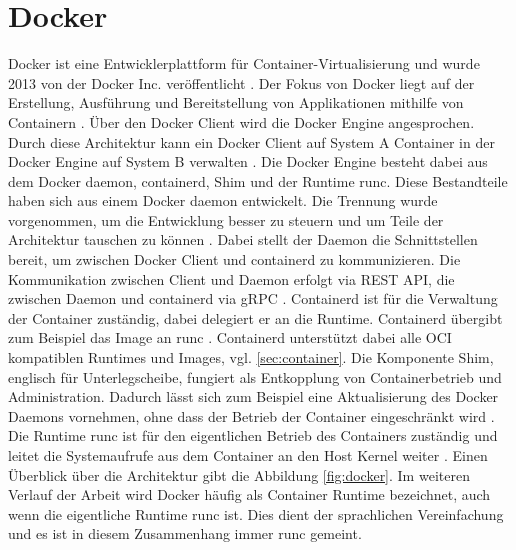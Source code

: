 \section{Docker}
\label{sec:docker}
Docker ist eine Entwicklerplattform für Container-Virtualisierung und wurde 2013 von der Docker Inc. veröffentlicht \cite[vgl.][10]{Jangla.2018}. Der Fokus von Docker liegt auf der Erstellung, Ausführung und Bereitstellung von Applikationen mithilfe von Containern \cite[vgl.][11]{Jangla.2018}.
Über den Docker Client wird die Docker Engine angesprochen. Durch diese Architektur kann ein Docker Client auf System A Container in der Docker Engine auf System B verwalten \cite[vgl.][55]{Poulton.2017}.
Die Docker Engine besteht dabei aus dem Docker daemon, containerd, Shim und der Runtime runc. Diese Bestandteile haben sich aus einem Docker daemon entwickelt. Die Trennung wurde vorgenommen, um die Entwicklung besser zu steuern und um Teile der Architektur tauschen zu können \cite[vgl.][55]{Poulton.2017}. 
Dabei stellt der Daemon die Schnittstellen bereit, um zwischen Docker Client und containerd zu kommunizieren. Die Kommunikation zwischen Client und Daemon erfolgt via REST API, die zwischen  Daemon und containerd via gRPC \cite[vgl.][60]{Poulton.2017}. 
Containerd ist für die Verwaltung der Container zuständig, dabei delegiert er an die Runtime. Containerd übergibt zum Beispiel das Image an runc \cite[vgl.][59]{Poulton.2017}. Containerd unterstützt dabei alle \ac{OCI} kompatiblen Runtimes und Images, vgl. \ref{sec:container}. Die Komponente Shim, englisch für Unterlegscheibe, fungiert als Entkopplung von Containerbetrieb und Administration. Dadurch lässt sich zum Beispiel eine Aktualisierung des Docker Daemons vornehmen, ohne dass der Betrieb der Container eingeschränkt wird  \cite[vgl.][S. 62 f.]{Poulton.2017}. Die Runtime runc ist für den eigentlichen Betrieb des Containers zuständig und leitet die Systemaufrufe aus dem Container an den Host Kernel weiter \cite[vgl.][59]{Poulton.2017}. Einen Überblick über die Architektur gibt die Abbildung \ref{fig:docker}.
Im weiteren Verlauf der Arbeit wird Docker häufig als Container Runtime bezeichnet, auch wenn die eigentliche Runtime runc ist. Dies dient der sprachlichen Vereinfachung und es ist in diesem Zusammenhang immer runc gemeint.

